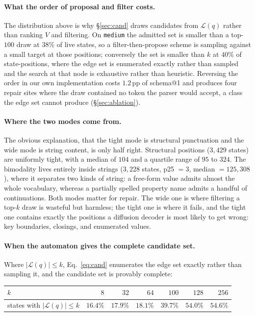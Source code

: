 \documentclass{article}
\begin{document}
\paragraph{What the order of proposal and filter costs.}
The distribution above is why \S\ref{sec:cand} draws candidates from
$\mathcal{L}(q)$ rather than ranking $V$ and filtering. On \texttt{medium} the
admitted set is smaller than a top-$100$ draw at $38\%$ of live states, so a
filter-then-propose scheme is sampling against a small target at those
positions; conversely the set is smaller than $k$ at $40\%$ of state-positions,
where the edge set is enumerated exactly rather than sampled and the search at
that node is exhaustive rather than heuristic. Reversing the order in our own
implementation costs $1.2$\,pp of schema@1 and produces four repair sites where
the draw contained no token the parser would accept, a class the edge set cannot
produce (\S\ref{sec:ablation}).

\paragraph{Where the two modes come from.}
The obvious explanation, that the tight mode is structural punctuation and the
wide mode is string content, is only half right. Structural positions
($3{,}429$ states) are uniformly tight, with a median of $104$ and a quartile
range of $95$ to $324$. The bimodality lives entirely inside strings ($3{,}228$
states, p25 $=3$, median $=125{,}308$), where it separates two kinds of string:
a free-form value admits almost the whole vocabulary, whereas a partially
spelled property name admits a handful of continuations. Both modes matter for
repair. The wide one is where filtering a top-$k$ draw is wasteful but harmless;
the tight one is where it fails, and the tight one contains exactly the
positions a diffusion decoder is most likely to get wrong: key boundaries,
closings, and enumerated values.

\paragraph{When the automaton gives the complete candidate set.}
Where $|\mathcal{L}(q)| \le k$, Eq.~\ref{eq:cand} enumerates the edge set exactly rather
than sampling it, and the candidate set is provably complete:

\begin{center}
\small
\begin{tabular}{lrrrrrr}
\toprule
$k$ & $8$ & $32$ & $64$ & $100$ & $128$ & $256$ \\
\midrule
states with $|\mathcal{L}(q)| \le k$ & $16.4\%$ & $17.9\%$ & $18.1\%$ & $39.7\%$ & $54.0\%$ & $54.6\%$ \\
\bottomrule
\end{tabular}
\end{center}
\end{document}

